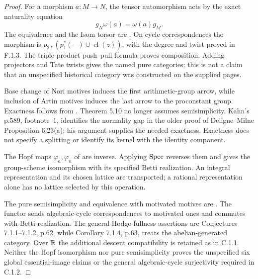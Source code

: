 \begin{proof}
For a morphism $a:M\to N$, the tensor automorphism acts by the exact naturality equation
\[
 g_N\omega(a)=\omega(a)g_M.
\]
The equivalence and the Isom torsor are \cite[Theorems 2.11 and 3.2]{DM1982}. On cycle correspondences the morphism is $p_{2*}(p_1^*(-)\cup\operatorname{cl}(z))$, with the degree and twist proved in F.1.3. The triple-product push--pull formula proves composition. Adding projectors and Tate twists gives the named pure categories; this is not a claim that an unspecified historical category was constructed on the supplied pages.

Base change of Nori motives induces the first arithmetic-group arrow, while inclusion of Artin motives induces the last arrow to the proconstant group. Exactness follows from \cite[Theorem 5.10, \S5.8, Theorem 10.2 and Remark 10.3]{AuditKahn2025}. Theorem 5.10 no longer assumes semisimplicity. Kahn's p.589, footnote~1, identifies the normality gap in the older proof of Deligne--Milne Proposition 6.23(a); his argument supplies the needed exactness. Exactness does not specify a splitting or identify its kernel with the identity component.

The Hopf maps $\varphi_a,\varphi_n$ of \cite[Theorem 9.1, p.41]{AuditChoudhuryGallauer2017} are inverse. Applying $\operatorname{Spec}$ reverses them and gives the group-scheme isomorphism with its specified Betti realization. An integral representation and its chosen lattice are transported; a rational representation alone has no lattice selected by this operation.

The pure semisimplicity and equivalence with motivated motives are \cite[Theorems 6.3.3 and 6.4.1, pp.57 and 60--61]{AuditArapura2013}. The functor sends algebraic-cycle correspondences to motivated ones and commutes with Betti realization. The general Hodge-fullness assertions are Conjectures 7.1.1--7.1.2, p.62, while Corollary 7.1.4, p.63, treats the abelian-generated category. Over $\mathbb R$ the additional descent compatibility is retained as in C.1.1. Neither the Hopf isomorphism nor pure semisimplicity proves the unspecified six global essential-image claims or the general algebraic-cycle surjectivity required in C.1.2.
\end{proof}

